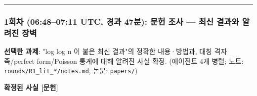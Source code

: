 \begin{center}\rule{0.5\linewidth}{0.5pt}\end{center}

\hypertarget{uxd68cuxcc28-06480711-utc-uxacbduxacfc-47uxbd84-uxbb38uxd5cc-uxc870uxc0ac-uxcd5cuxc2e0-uxacb0uxacfcuxc640-uxc54cuxb824uxc9c4-uxc7a5uxbcbd}{%
\subsubsection*{1회차 (06:48--07:11 UTC, 경과 47분): 문헌 조사 --- 최신 결과와 알려진 장벽}\label{uxd68cuxcc28-06480711-utc-uxacbduxacfc-47uxbd84-uxbb38uxd5cc-uxc870uxc0ac-uxcd5cuxc2e0-uxacb0uxacfcuxc640-uxc54cuxb824uxc9c4-uxc7a5uxbcbd}}

\textbf{선택한 과제}: "log log n 이 붙은 최신 결과"의 정확한 내용·방법과, 대칭 격자족/perfect form/Poisson 통계에 대해 알려진 사실 확정. (에이전트 4개 병렬; 노트: \texttt{rounds/R1\_lit\_*/notes.md}, 논문: \texttt{papers/})

\textbf{확정된 사실 {[}문헌{]}}

